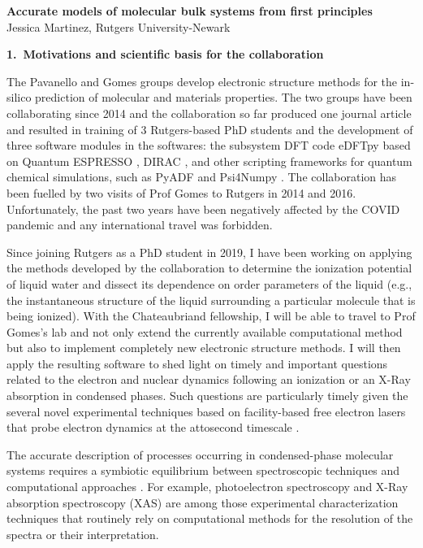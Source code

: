 \documentclass[notitlepage,12pt]{report}
\begin{document}
\renewcommand\Affilfont{\itshape\small}
\begin{center}
    \textbf{\LARGE Accurate models of molecular bulk systems from first principles}\\
    Jessica Martinez, Rutgers University-Newark
\end{center}

\textbf{\large 1.\ Motivations and scientific basis for the collaboration}

    The Pavanello and Gomes groups develop electronic structure methods for the in-silico prediction of molecular and materials properties. The two groups have been collaborating since 2014 and the collaboration so far produced one journal article \supercite{tolle2019charged} and resulted in training of 3 Rutgers-based PhD students and the development of three software modules in the softwares: the subsystem DFT code eDFTpy\supercite{edftpy} based on Quantum ESPRESSO \supercite{qe}, DIRAC \supercite{saue2020dirac}, and other scripting frameworks for quantum chemical simulations, such as PyADF \supercite{Jacob_2011} and Psi4Numpy \supercite{smith2018psi4numpy}. The collaboration has been fuelled by two visits of Prof Gomes to Rutgers in 2014 and 2016. Unfortunately, the past two years have been negatively affected by the COVID pandemic and any international travel was forbidden. 

    Since joining Rutgers as a PhD student in 2019, I have been working on applying the methods developed by the collaboration to determine the ionization potential of liquid water and dissect its dependence on order parameters of the liquid (e.g., the instantaneous structure of  the liquid surrounding a particular molecule that is being ionized).   With the Chateaubriand fellowship, I will be able to travel to Prof Gomes's lab and not only extend the currently available computational method  but also to implement completely new electronic structure methods. I will then apply the resulting software to shed light on timely and important questions related to the electron and nuclear dynamics following an ionization or an X-Ray absorption in condensed phases. Such questions are particularly timely given the several novel experimental techniques based on facility-based free electron lasers that probe electron dynamics at the attosecond timescale \supercite{Duris_2019}.  

    The accurate description of processes occurring in condensed-phase molecular systems requires a symbiotic  equilibrium between spectroscopic techniques\supercite{reimann2021two,malerz2021low,bolognesi2021combined} and computational approaches \supercite{couto2007understanding,ambrosio2016structural,ozaki2021advances}. For example, photoelectron spectroscopy \supercite{thurmer2021accurate,perry2020ionization,credidio2021quantitative,thurmer2021valence,tolle2019charged,gaiduk2018electron,gaiduk2016photoelectron,seidel2016valence} and X-Ray absorption spectroscopy (XAS)\supercite{zhovtobriukh2019liquid,zhang2020isotope,smith2020femtosecond} are among those experimental characterization techniques that routinely rely on computational methods for the resolution of the spectra or their interpretation.
	
\end{document}
